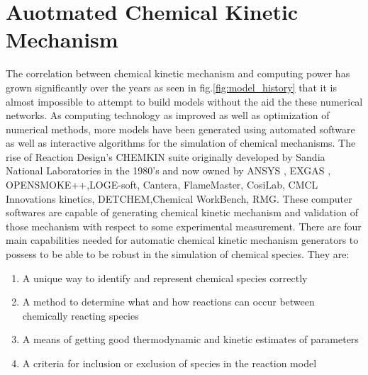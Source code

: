  \section{Auotmated Chemical Kinetic Mechanism}
 The correlation between chemical kinetic mechanism and computing power has grown significantly over the years as seen in fig.\ref{fig:model_history} that it is almost impossible to attempt to build models without the aid the these numerical networks. As computing technology as improved as well as optimization of numerical methods, more models have been generated using automated software as well as interactive algorithms for the simulation of chemical mechanisms. The rise of Reaction Design's CHEMKIN suite originally developed by Sandia National Laboratories in the 1980's and now owned by ANSYS \cite{ANSYSCHEMKIN-PRO}, EXGAS \cite{Warth2000ComputerOxidation}, OPENSMOKE++\cite{Cuoci2015OpenSMOKE++:Mechanisms}\cite{Cuoci2013NumericalMethod}\cite{Stagni2014LumpingCoupling},LOGE-soft\cite{LOGESOFT}, Cantera\cite{cantera}, FlameMaster\cite{Pitsch1990FlameMasterCalculations}, CosiLab\cite{CosilabLaboratory}, CMCL Innovations kinetics\cite{ComputationalBuilder}, DETCHEM\cite{Deutschmann2019DETCHEMEd.},Chemical WorkBench\cite{Kintechlab:ChemicalWorkBench}, RMG\cite{Gao2016ReactionMechanisms}\cite{Allen2012AutomaticCoefficients}\cite{Magoon2013DesignGeneration}. These computer softwares are capable of generating chemical kinetic mechanism and validation of those mechanism with respect to some experimental measurement. There are four main capabilities needed for automatic chemical kinetic mechanism generators to possess to be able to be robust in the simulation of chemical species. They are:
 \begin{enumerate}
     \item A unique way to identify and represent chemical species correctly
     \item A method to determine what and how reactions can occur between chemically reacting species
     \item A means of getting good thermodynamic and kinetic estimates of parameters
     \item A criteria for inclusion or exclusion of species in the reaction model
 \end{enumerate}
     
